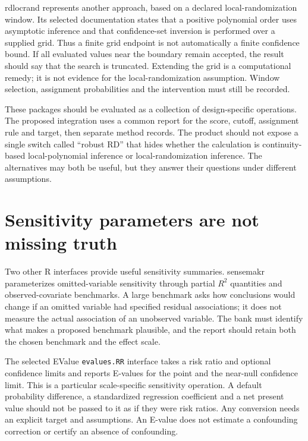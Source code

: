 rdlocrand represents another approach, based on a declared local-randomization
window. Its selected documentation states that a positive polynomial order
uses asymptotic inference and that confidence-set inversion is performed over
a supplied grid. Thus a finite grid endpoint is not automatically a finite
confidence bound. If all evaluated values near the boundary remain accepted,
the result should say that the search is truncated. Extending the grid is a
computational remedy; it is not evidence for the local-randomization assumption.
Window selection, assignment probabilities and the intervention must still be
recorded.\cite{rdlocrand}

These packages should be evaluated as a collection of design-specific
operations. The proposed integration uses a common report for the score,
cutoff, assignment rule and target, then separate method records. The product
should not expose a single switch called ``robust RD'' that hides whether the
calculation is continuity-based local-polynomial inference or local-randomization
inference. The alternatives may both be useful, but they answer their questions
under different assumptions.

\section{Sensitivity parameters are not missing truth}

Two other R interfaces provide useful sensitivity summaries. sensemakr
parameterizes omitted-variable sensitivity through partial \(R^2\) quantities
and observed-covariate benchmarks. A large benchmark asks how conclusions would
change if an omitted variable had specified residual associations; it does not
measure the actual association of an unobserved variable. The bank must identify
what makes a proposed benchmark plausible, and the report should retain both
the chosen benchmark and the effect scale.\cite{sensemakr}

The selected EValue \texttt{evalues.RR} interface takes a risk ratio and optional
confidence limits and reports E-values for the point and the near-null confidence
limit. This is a particular scale-specific sensitivity operation. A default
probability difference, a standardized regression coefficient and a net present
value should not be passed to it as if they were risk ratios. Any conversion
needs an explicit target and assumptions. An E-value does not estimate a
confounding correction or certify an absence of confounding.\cite{evalue}

